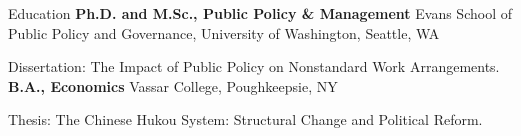 \begin{rubric}{Education}
\entry*[2016 - 2021]%
    \textbf{Ph.D. and M.Sc., Public Policy \& Management} Evans School of Public Policy and Governance, University of Washington, Seattle, WA
    \par Dissertation: The Impact of Public Policy on Nonstandard Work Arrangements.
\entry*[2012 - 2016]%
    \textbf{B.A., Economics} Vassar College, Poughkeepsie, NY
    \par Thesis: The Chinese Hukou System: Structural Change and Political Reform.
\end{rubric}
